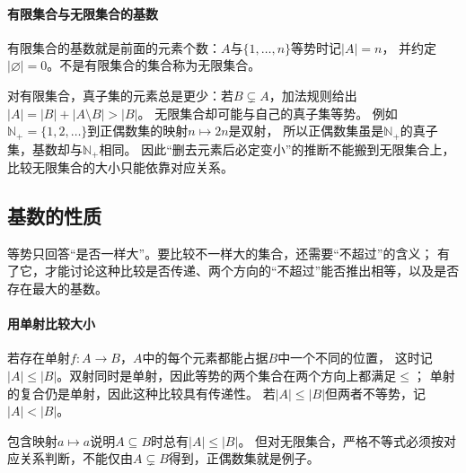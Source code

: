 \paragraph{有限集合与无限集合的基数}
有限集合的基数就是前面的元素个数：$A$与$\{1,\ldots,n\}$等势时记$|A|=n$，
并约定$|\varnothing|=0$。不是有限集合的集合称为无限集合。

对有限集合，真子集的元素总是更少：若$B\subsetneq A$，加法规则给出$|A|=|B|+|A\setminus B|>|B|$。
无限集合却可能与自己的真子集等势。
例如$\mathbb N_+=\{1,2,\ldots\}$到正偶数集的映射$n\mapsto2n$是双射，
所以正偶数集虽是$\mathbb N_+$的真子集，基数却与$\mathbb N_+$相同。
因此“删去元素后必定变小”的推断不能搬到无限集合上，
比较无限集合的大小只能依靠对应关系。

\subsection{基数的性质}
\label{sec:comb-cardinality-properties}

等势只回答“是否一样大”。要比较不一样大的集合，还需要“不超过”的含义；
有了它，才能讨论这种比较是否传递、两个方向的“不超过”能否推出相等，以及是否存在最大的基数。

\paragraph{用单射比较大小}
若存在单射$f:A\to B$，$A$中的每个元素都能占据$B$中一个不同的位置，
这时记$|A|\leq|B|$。双射同时是单射，因此等势的两个集合在两个方向上都满足$\leq$；
单射的复合仍是单射，因此这种比较具有传递性。
若$|A|\leq|B|$但两者不等势，记$|A|<|B|$。

包含映射$a\mapsto a$说明$A\subseteq B$时总有$|A|\leq|B|$。
但对无限集合，严格不等式必须按对应关系判断，不能仅由$A\subsetneq B$得到，正偶数集就是例子。

